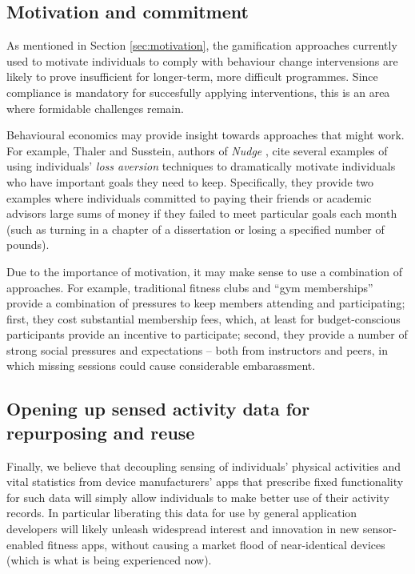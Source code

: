 \documentclass{sig-alternate}
\begin{document}

\subsection{Motivation and commitment}

As mentioned in Section \ref{sec:motivation}, the gamification
approaches currently used to motivate individuals to comply with
behaviour change intervensions are likely to prove insufficient for
longer-term, more difficult programmes. Since compliance is mandatory
for succesfully applying interventions, this is an area where
formidable challenges remain.

Behavioural economics may provide insight towards approaches that
might work.  For example, Thaler and Susstein, authors of \emph{Nudge}
\cite{nudge}, cite several examples of using individuals' \emph{loss
  aversion} techniques to dramatically motivate individuals who have
important goals they need to keep.  Specifically, they provide two
examples where individuals committed to paying their friends or
academic advisors large sums of money if they failed to meet
particular goals each month (such as turning in a chapter of a
dissertation or losing a specified number of pounds).

Due to the importance of motivation, it may make sense to use a
combination of approaches.  For example, traditional fitness clubs and
``gym memberships'' provide a combination of pressures to keep members
attending and participating; first, they cost substantial membership
fees, which, at least for budget-conscious participants provide an
incentive to participate; second, they provide a number of strong
social pressures and expectations -- both from instructors and peers,
in which missing sessions could cause considerable embarassment.

\subsection{Opening up sensed activity data for repurposing and reuse}

Finally, we believe that decoupling sensing of individuals' physical
activities and vital statistics from device manufacturers' apps that
prescribe fixed functionality for such data will simply allow
individuals to make better use of their activity records.  In
particular liberating this data for use by general application
developers will likely unleash widespread interest and innovation in
new sensor-enabled fitness apps, without causing a market flood of
near-identical devices (which is what is being experienced now). 
\end{document}
